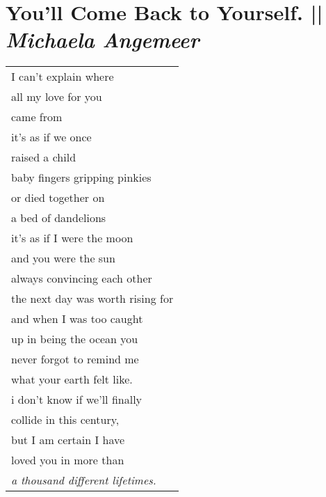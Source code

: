 \section[You’ll Come Back to Yourself]{You’ll Come Back to Yourself. || \emph{Michaela Angemeer} \hspace*{\fill}  \thepage}
\vfill
\begin{center}
\begin{tabular}{l}
I can’t explain where\\ 
all my love for you\\
came from\\
it’s as if we once \\
raised a child\\
baby fingers gripping pinkies\\
or died together on\\
a bed of dandelions\\
it’s as if I were the moon\\
and you were the sun\\
always convincing each other\\
the next day was worth rising for\\
and when I was too caught\\
up in being the ocean you\\
never forgot to remind me\\
what your earth felt like.\\ 
i don’t know if we’ll finally\\
collide in this century,\\
but I am certain I have\\
loved you in more than\\
\emph{a thousand different lifetimes.}
\end{tabular}
\end{center}
\vfill